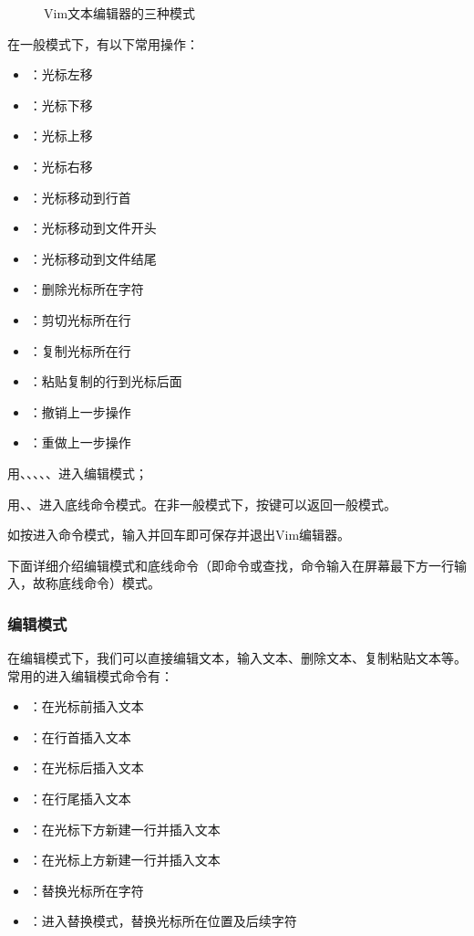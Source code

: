 \begin{figure}[!h]
\begin{tikzpicture}[x=0.75pt,y=0.75pt,yscale=-1,xscale=1]
\end{tikzpicture}


\caption{Vim文本编辑器的三种模式} 
\end{figure} 

在一般模式下，有以下常用操作：
\begin{itemize}
\item {}：光标左移
\item {}：光标下移
\item {}：光标上移
\item {}：光标右移
\item {}：光标移动到行首
\item {}：光标移动到文件开头
\item {}：光标移动到文件结尾
\item {}：删除光标所在字符
\item {}：剪切光标所在行
\item {}：复制光标所在行
\item {}：粘贴复制的行到光标后面
\item {}：撤销上一步操作 
\item {}：重做上一步操作
\end{itemize}

用、、、、、进入编辑模式；

用\code{:}、\code{/}、进入底线命令模式。在非一般模式下，按键可以返回一般模式。

如按\code{:}进入命令模式，输入并回车即可保存并退出Vim编辑器。

下面详细介绍编辑模式和底线命令（即命令或查找，命令输入在屏幕最下方一行输入，故称底线命令）模式。

\subsubsection{编辑模式}
在编辑模式下，我们可以直接编辑文本，输入文本、删除文本、复制粘贴文本等。
常用的进入编辑模式命令有：
\begin{itemize}
\item {}：在光标前插入文本
\item {}：在行首插入文本
\item {}：在光标后插入文本
\item {}：在行尾插入文本
\item {}：在光标下方新建一行并插入文本
\item {}：在光标上方新建一行并插入文本
\item {}：替换光标所在字符
\item {}：进入替换模式，替换光标所在位置及后续字符
\end{itemize}

